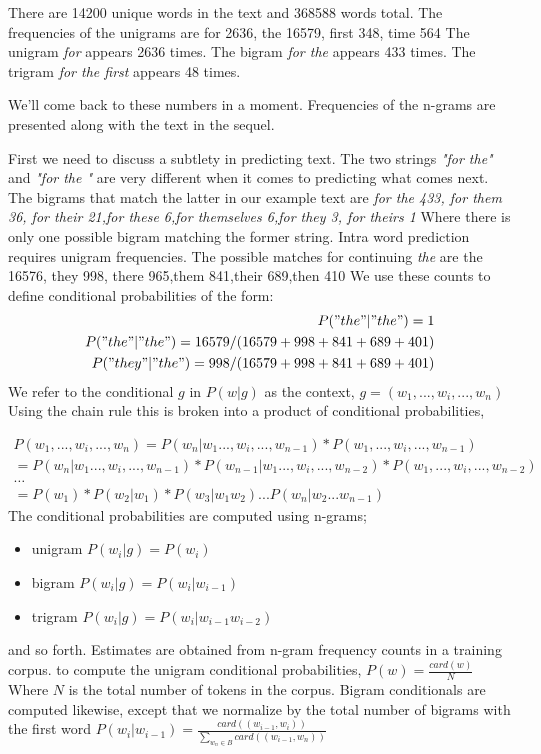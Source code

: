 There are 14200 unique words in the text and 368588 words total.  The frequencies of the unigrams are
{for 2636, the 16579, first 348, time 564}
The unigram \emph{for} appears 2636 times.
The bigram \emph{for the} appears 433 times.
The trigram \emph{for the first} appears 48 times.

We'll come back to these numbers in a moment. Frequencies of the n-grams are presented along with the text in the sequel.

First we need to discuss a subtlety in predicting text.  The two strings \emph{"for the"} and \emph{"for the " } are very different when it comes to predicting what comes next.  The bigrams that match the latter in our example text are
\emph{{for the 433, for them 36, for their 21,for these 6,for themselves 6,for they 3, for theirs 1}}
Where there is only one possible bigram matching the former string. Intra word prediction requires unigram frequencies. The possible matches for continuing \emph{the} are {the 16576, they 998, there 965,them 841,their 689,then 410} We use these counts to define conditional probabilities of the form:
\begin{eqnarray*}
P("the" | "the ") =1 \\
P("the" | "the") = 16579/(16579+998+841+689+401) \\
P("they" | "the") = 998/(16579+998+841+689+401)
\end{eqnarray*}
We refer to the conditional $g$ in $P(w|g)$ as the context, $ g= (w_{1}, ...,w_{i},...,w_{n})$  Using the chain rule this is broken into a product of conditional probabilities,

\begin{eqnarray*}
P(w_{1}, ...,w_{i},...,w_{n}) = P(w_{n}|w_{1} ...,w_{i},...,w_{n-1}) * P(w_{1}, ...,w_{i},...,w_{n-1}) \\
 = P(w_{n}|w_{1} ...,w_{i},...,w_{n-1}) * P(w_{n-1}|w_{1} ...,w_{i},...,w_{n-2}) * P(w_{1}, ...,w_{i},...,w_{n-2})\\
\ldots \\
= P(w_{1}) * P(w_{2} | w_{1}) * P(w_{3} | w_{1} w_{2}) ... P(w_{n} | w_{2} ...w_{n-1})
\end{eqnarray*}
The conditional probabilities are computed using n-grams;
\begin{itemize}
\item unigram $P(w_{i} | g) = P(w_{i})$ \\
\item bigram  $P(w_{i} | g) = P(w_{i} | w_{i-1})$ \\
\item trigram $P(w_{i} | g) =  P(w_{i} | w_{i-1} w_{i-2})$
\end{itemize}
and so forth.  Estimates are obtained from n-gram frequency counts in a training corpus.
to compute the unigram conditional probabilities, $P(w) =  \frac{card(w) }{N}$ Where $N$ is the total number of tokens in the corpus. Bigram conditionals are computed likewise, except that we normalize by the total number of bigrams with the first word $P(w_{i} | w_{i-1}) =  \frac{card( (w_{i-1},w_{i}) ) }{\sum\limits_{w_{n} \in B} card( (w_{i-1},w_{n}))}$

